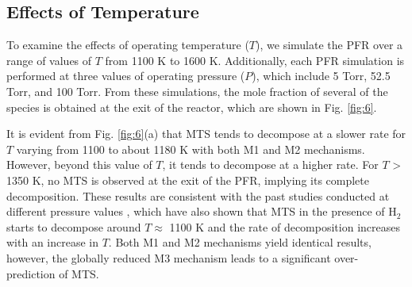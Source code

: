 \documentclass[final, letterpaper, square, comma, numbers, sort&compress]{elsarticle}
\begin{document}
\subsection{Effects of Temperature}
\label{S:4.1}
To examine the effects of operating temperature ($T$), we simulate the PFR over a range of values of $T$ from 1100 K to 1600 K. Additionally, each PFR simulation is performed at three values of operating pressure ($P$), which include 5 Torr, 52.5 Torr, and 100 Torr. From these simulations, the mole fraction of several of the species is obtained at the exit of the reactor, which are shown in Fig. \ref{fig:6}.

It is evident from Fig. \ref{fig:6}(a) that MTS tends to decompose at a slower rate for $T$ varying from 1100 to about 1180 K with both M1 and M2 mechanisms. However, beyond this value of $T$, it tends to decompose at a higher rate. For $T$ > 1350 K, no MTS is observed at the exit of the PFR, implying its complete decomposition. These results are consistent with the past studies conducted at different pressure values \cite{Dang2022,Peng2021,Yang2009}, which have also shown that MTS in the presence of H$_2$ starts to decompose around $T\approx$ 1100 K and the rate of decomposition increases with an increase in $T$. Both M1 and M2 mechanisms yield identical results, however, the globally reduced M3 mechanism leads to a significant over-prediction of MTS.
\end{document}
